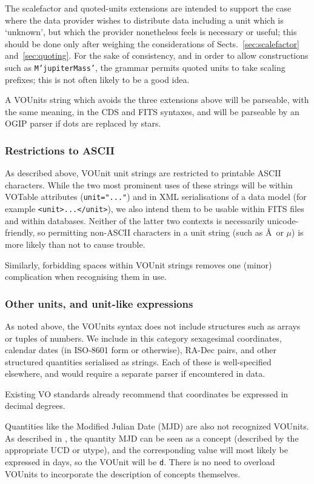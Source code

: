 \documentclass[11pt,notitlepage,onecolumn]{ivoa}
\newcommand{\unit}[1]{\texttt{\small\color{orange}#1}}
\begin{document}
The scalefactor and quoted-units extensions are intended to support
the case where the data provider wishes to distribute data including a
unit which is `unknown', but which the provider nonetheless feels is
necessary or useful; this should be done only after weighing the
considerations of Sects.~\ref{sec:scalefactor} and~\ref{sec:quoting}.
For the sake of consistency, and in order to allow
constructions such as \texttt{M'jupiterMass'}, the grammar permits quoted
units to take scaling prefixes; this is not often likely to be a good idea.

A VOUnits string which avoids the three extensions above will be
parseable, with the same meaning, in the CDS and FITS syntaxes, and
will be parseable by an OGIP parser if dots are replaced by stars.

\subsubsection{Restrictions to ASCII}

As described above, VOUnit unit strings are restricted to printable
ASCII characters.  While the two most prominent uses of these strings
will be within VOTable attributes (\verb|unit="..."|) and in XML
serialisations of a data model (for example \verb|<unit>...</unit>|),
we also intend them to be usable within FITS files and within
databases.  Neither of the latter two contexts is necessarily
unicode-friendly, so permitting non-ASCII characters in a unit string
(such as \AA\ or $\mu$) is more likely than not to cause trouble.

Similarly, forbidding spaces within VOUnit strings removes one (minor)
complication when recognising them in use.

\subsubsection{Other units, and unit-like expressions}

As noted above, the VOUnits syntax does not include structures such as
arrays or tuples of numbers.  We include in this category sexagesimal
coordinates, calendar dates (in ISO-8601 form or otherwise),
RA-Dec pairs, and other structured quantities serialised as strings.
Each of these is well-specified elsewhere, and would require a
separate parser if encountered in data.

Existing VO standards already recommend that coordinates be expressed
in decimal degrees.

Quantities like the Modified Julian Date (MJD) are also not recognized
VOUnits. As described in , the quantity MJD
can be seen as a concept (described by the appropriate UCD or utype),
and the corresponding value will most likely be expressed in days, so
the VOUnit will be \unit{d}. There is no need to overload VOUnits to
incorporate the description of concepts themselves.
\end{document}

